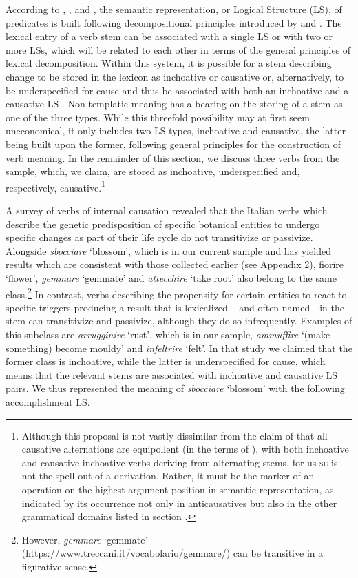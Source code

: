 \documentclass[output=paper,colorlinks,citecolor=brown
]{langscibook}
\begin{document}
According to \citet[82—129]{vanvalin1997syntax}, \citet[32—49]{vanvalin2005exploring}, and \citet[94—107]{vanvalin2023principles}, the semantic representation, or Logical Structure (LS), of predicates is built following decompositional principles introduced by \citet{vendler1967linguistics} and \citet{dowty1979word}. The lexical entry of a verb stem can be associated with a single LS or with two or more LSs, which will be related to each other in terms of the general principles of lexical decomposition. Within this system, it is possible for a stem describing change to be stored in the lexicon as inchoative or causative or, alternatively, to be underspecified for cause and thus be associated with both an inchoative and a causative LS \citep{brocher2017full}. Non-templatic meaning has a bearing on the storing of a stem as one of the three types. While this threefold possibility may at first seem uneconomical, it only includes two LS types, inchoative and causative, the latter being built upon the former, following general principles for the construction of verb meaning. In the remainder of this section, we discuss three verbs from the sample, which, we claim, are stored as inchoative, underspecified and, respectively, causative.\footnote{Although this proposal is not vastly dissimilar from the claim of \citet{pinon2001finer} that all causative alternations are equipollent (in the terms of \cite{haspelmath1993more}), with both inchoative and causative-inchoative verbs deriving from alternating stems, for us \textsc{se} is not the spell-out of a derivation. Rather, it must be the marker of an operation on the highest argument position in semantic representation, as indicated by its occurrence not only in anticausatives but also in the other grammatical domains listed in section .}

A survey of verbs of internal causation \citep{bentley2023internally} revealed that the Italian verbs which describe the genetic predisposition of specific botanical entities to undergo specific changes as part of their life cycle do not transitivize or passivize. Alongside \textit{sbocciare} ‘blossom’, which is in our current sample and has yielded results which are consistent with those collected earlier (see Appendix 2), fiorire ‘flower’, \textit{gemmare} ‘gemmate’ and \textit{attecchire} ‘take root’ also belong to the same class.\footnote{However, \textit{gemmare} ‘gemmate’ (https://www.treccani.it/vocabolario/gemmare/) can be transitive in a figurative sense.}   In contrast, verbs describing the propensity for certain entities to react to specific triggers producing a result that is lexicalized – and often named - in the stem can transitivize and passivize, although they do so infrequently. Examples of this subclass are \textit{arrugginire} ‘rust’, which is in our sample, \textit{ammuffire} ‘(make something) become mouldy’ and \textit{infeltrire} ‘felt’. In that study we claimed that the former class is inchoative, while the latter is underspecified for cause, which means that the relevant stems are associated with inchoative and causative LS pairs. We thus represented the meaning of \textit{sbocciare} ‘blossom’ with the following accomplishment LS. 
\end{document}
